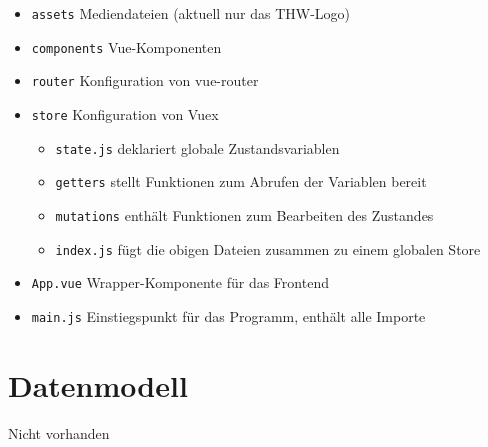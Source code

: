 \documentclass[a4paper,11pt,oneside, titlepage]{article}
\begin{document}

    \begin{itemize}
      \item \verb+assets+ Mediendateien (aktuell nur das THW-Logo)
      \item \verb+components+ Vue-Komponenten
      \item \verb+router+ Konfiguration von vue-router
      \item \verb+store+ Konfiguration von Vuex
        \begin{itemize}
          \item \verb+state.js+ deklariert globale Zustandsvariablen
          \item \verb+getters+ stellt Funktionen zum Abrufen der Variablen bereit
          \item \verb+mutations+ enthält Funktionen zum Bearbeiten des Zustandes
          \item \verb+index.js+ fügt die obigen Dateien zusammen zu einem globalen Store
        \end{itemize}
      \item \verb+App.vue+ Wrapper-Komponente für das Frontend
      \item \verb+main.js+ Einstiegspunkt für das Programm, enthält alle Importe
    \end{itemize}

\begin{minipage}{16cm}
\end{minipage}



\section{Datenmodell}
Nicht vorhanden


  

  \newpage

  \printglossaries
\end{document}
